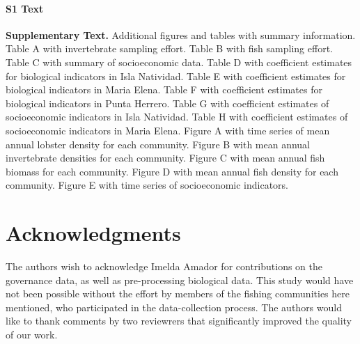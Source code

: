 \documentclass[10pt,letterpaper]{article}
\begin{document}
\paragraph*{S1 Text}
\label{S1_Text}
{\bf Supplementary Text.} Additional figures and tables with summary information. Table A with invertebrate sampling effort. Table B with fish sampling effort. Table C with summary of socioeconomic data. Table D with coefficient estimates for biological indicators in Isla Natividad. Table E with coefficient estimates for biological indicators in Maria Elena. Table F with coefficient estimates for biological indicators in Punta Herrero. Table G with coefficient estimates of socioeconomic indicators in Isla Natividad. Table H with coefficient estimates of socioeconomic indicators in Maria Elena. Figure A with time series of mean annual lobster density for each community. Figure B with mean annual invertebrate densities for each community. Figure C with mean annual fish biomass for each community. Figure D with mean annual fish density for each community. Figure E with time series of socioeconomic indicators.

\section*{Acknowledgments}

The authors wish to acknowledge Imelda Amador for contributions on the governance data, as well as pre-processing biological data. This study would have not been possible without the effort by members of the fishing communities here mentioned, who participated in the data-collection process. The authors would like to thank comments by two reviewrers that significantly improved the quality of our work.


\nolinenumbers

%
%
% 



\end{document}
